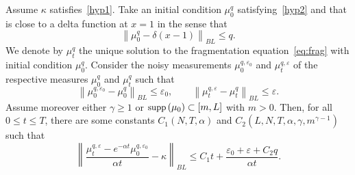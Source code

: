 \documentclass[AHL,Unicode,longabstracts,published]{cedram}
\newcommand*\eps{\varepsilon}
\renewcommand*\a{\alpha}
\newcommand*\supp{{\mbox{\small\rm supp}}\,}
\begin{document}
\begin{theo}\label{thm:stab}
Assume $\kappa$ satisfies~\eqref{hyp1}. Take an initial condition $\mu_0^{q}$ satisfying~\eqref{hyp2} and that is close to a delta function at $x=1$ in the sense that
\begin{equation*}
\left\|\mu_0^{q} - \delta(x-1)\right\|_{BL} \leq q.
\end{equation*}
We denote by $\mu_t^q$ the unique solution to the fragmentation equation~\eqref{eq:frag} with initial condition $\mu_0^{q}$. Consider the noisy measurements $\mu_0^{q,\eps_0}$ and $\mu_t^{q,\eps}$ of the respective measures $\mu_0^q$ and $\mu_t^q$ such that
\begin{equation*}
\left\|\mu_0^{q,\eps_0}- \mu_0^q\right\|_{BL} \leq \eps_0,\qquad
\left\|\mu_t^{q,\eps}- \mu_t^q\right\|_{BL} \leq \eps.
\end{equation*}
Assume moreover either $\gamma\geq 1$ or $\supp (\mu_0)\subset [m,L]$ with $m>0$. Then, for all $0\leq t\leq T$, there are some constants $C_1(N,T,\alpha)$ and $C_2(L,N,T,\alpha,\gamma,m^{\gamma-1})$ such that
\begin{equation}\label{thm:stabE4}
\left\|\frac{\mu_t^{q,\eps} - e^{-\a t} \mu_0^{q,\eps_0} }{\a t}-\kappa\right\|_{BL}
\leq C_1 t + \frac{\eps_0+\eps+ C_2 q}{\a t}.
\end{equation}
\end{theo}
\end{document}
